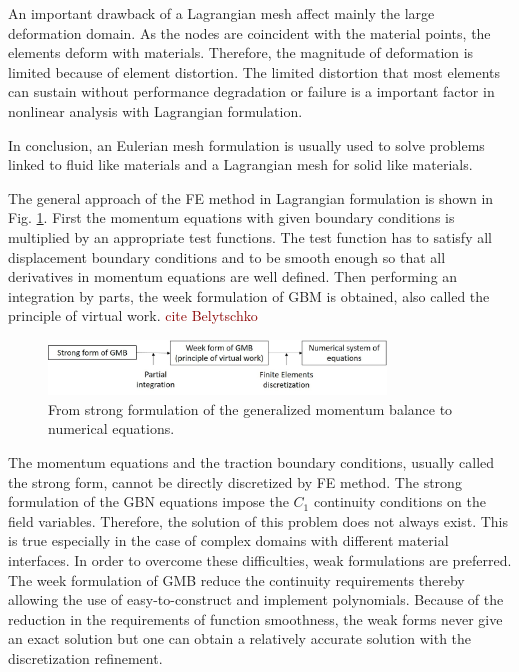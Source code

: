 An important drawback of a Lagrangian mesh affect mainly the large deformation domain. As the nodes are coincident with the material points, the elements deform with materials. Therefore, the magnitude of deformation is limited because of element distortion. The limited distortion that most elements can sustain without performance degradation or failure is a important factor in nonlinear analysis with Lagrangian formulation. 

In conclusion, an Eulerian mesh formulation is usually used to solve problems linked to fluid like materials and a Lagrangian mesh for solid like materials.

\label{subsection:lagrangianmesh}

The general approach of the FE method in Lagrangian formulation is shown in Fig. \ref{fe_method}. First the momentum equations with given boundary conditions is multiplied by an appropriate test functions. The test function has to satisfy all displacement boundary conditions and to be smooth enough so that all derivatives in momentum equations are well defined. Then performing an integration by parts, the week formulation of GBM is obtained, also called the principle of virtual work. \textcolor{darkred}{cite Belytschko}

\begin{figure}[!h]
\centering
\includegraphics[width=0.8\textwidth,keepaspectratio]{figures/fe_method.jpg}
\caption{From strong formulation of the generalized momentum balance to numerical equations.}
\label{fe_method}
\end{figure}




 The momentum equations and the traction boundary conditions, usually called the strong form, cannot be directly discretized by FE method. The strong formulation of the GBN equations impose the $C_1$ continuity conditions on the field variables. Therefore, the solution of this problem does not always exist. This is true especially in the case of complex domains with different material interfaces. In order to overcome these difficulties, weak formulations are preferred. The week formulation of GMB reduce the continuity requirements thereby allowing the use of easy-to-construct and implement polynomials. Because of the reduction in the requirements of function smoothness, the weak forms never give an exact solution but one can obtain a relatively accurate solution with the discretization refinement.



